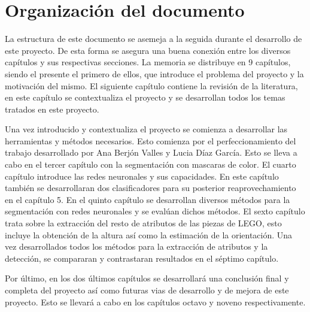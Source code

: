 \section{Organización del documento}
\label{sec:Organización}
La estructura de este documento se asemeja a la seguida durante el desarrollo de este proyecto. De esta forma se asegura una buena conexión entre los diversos capítulos y sus respectivas secciones. La memoria se distribuye en 9 capítulos, siendo el presente el primero de ellos, que introduce el problema del proyecto y la motivación del mismo. El siguiente capítulo contiene la revisión de la literatura, en este capítulo se contextualiza el proyecto y se desarrollan todos los temas tratados en este proyecto.

Una vez introducido y contextualiza el proyecto se comienza a desarrollar las herramientas y métodos necesarios. Esto comienza por el perfeccionamiento del trabajo desarrollado por Ana Berjón Valles y Lucia Díaz García. Esto se lleva a cabo en el tercer capítulo con la segmentación con mascaras de color. El cuarto capítulo introduce las redes neuronales y sus capacidades. En este capítulo también se desarrollaran dos clasificadores para su posterior reaprovechamiento en el capítulo 5. En el quinto capítulo se desarrollan diversos métodos para la segmentación con redes neuronales y se evalúan dichos métodos. El sexto capítulo trata sobre la extracción del resto de atributos de las piezas de LEGO, esto incluye la obtención de la altura así como la estimación de la orientación. Una vez desarrollados todos los métodos para la extracción de atributos y la detección, se compararan y contrastaran resultados en el séptimo capítulo.

Por último, en los dos últimos capítulos se desarrollará una conclusión final y completa del proyecto así como futuras vias de desarrollo y de mejora de este proyecto. Esto se llevará a cabo en los capítulos octavo y noveno respectivamente.